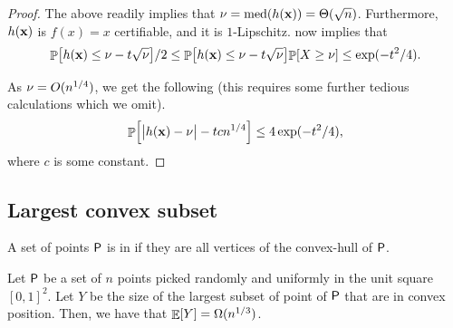 \begin{proof}
    The above readily implies that
    $\medianC = \medX{h(\vecX)} = \Theta( \sqrt{n})$. Furthermore,
    $h(\mathbf{x})$ is $f(x) =x$ certifiable, and it is $1$-Lipschitz.
     now implies that
    \begin{equation*} 
        \Prob{ h(\vecX) \leq \medianC - t\sqrt{\medianC}}/2
        \leq%
        \Prob{ h(\vecX) \leq \medianC - t\sqrt{\medianC}}%
        \!\Prob{X \geq \medianC} \leq \exp(-t^2/4).
    \end{equation*}

    As $\nu = O(n^{1/4})$, we get the following (this requires
    some further tedious calculations which we omit).
    \begin{equation*} 
        \Prob{ \cardin{\bigl. h(\vecX) - \medianC} - t cn^{1/4}}        
        \leq%
        4 \exp(-t^2/4),
    \end{equation*}
    where $c$ is some constant.
\end{proof}




\subsection{Largest convex subset}

A set of points ${\mathsf{P}}$ is in  if they are
all vertices of the convex-hull of ${\mathsf{P}}$.

\begin{lemma}
    Let ${\mathsf{P}}$ be a set of $n$ points picked randomly and uniformly
    in the unit square $[0,1]^2$. Let $Y$ be the size of the largest
    subset of point of ${\mathsf{P}}$ that are in convex position. Then, we
    have that $\mathop{\mathbb{E}}\!\left[ {Y} \right] = \Omega(n^{1/3})$.
\end{lemma}

